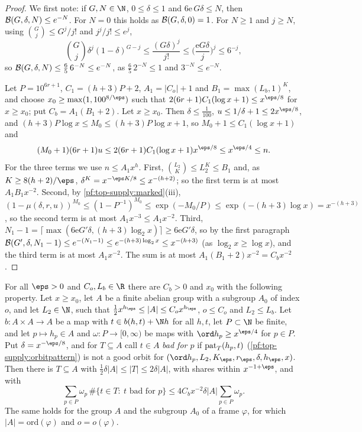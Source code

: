 \begin{proof}
We first note: if $G,N\in\N$, $0\le\delta\le1$ and $6\mathrm e\,G\delta\le N$, then $\mathcal{B}(G,\delta,N)\le e^{-N}$.
For $N=0$ this holds as $\mathcal{B}(G,\delta,0)=1$. For $N\ge1$ and $j\ge N$, using $\binom Gj\le G^j/j!$ and
$j^j/j!\le e^j$,
\[
\binom Gj\delta^j(1-\delta)^{G-j}\le\frac{(G\delta)^j}{j!}\le\Big(\frac{\mathrm eG\delta}j\Big)^j\le6^{-j},
\]
so $\mathcal{B}(G,\delta,N)\le\frac65\,6^{-N}\le e^{-N}$, as $\frac65\,2^{-N}\le1$ and $3^{-N}\le e^{-N}$.

Let $P=10^{6r+1}$, $C_1=(h+3)P+2$, $A_1=|C_o|+1$ and $B_1=\max(L_b,1)^K$, and choose $x_0\ge\max(1,100^{8/\eps})$ such that
$2(6r+1)C_1(\log x+1)\le x^{\eps/8}$ for $x\ge x_0$; put $C_b=A_1(B_1+2)$. Let $x\ge x_0$. Then $\delta\le\frac1{100}$,
$u\le1/\delta+1\le2x^{\eps/8}$, and $(h+3)P\log x\le M_0\le(h+3)P\log x+1$, so $M_0+1\le C_1(\log x+1)$ and
\[
(M_0+1)(6r+1)u\le2(6r+1)C_1(\log x+1)x^{\eps/8}\le x^{\eps/4}\le n.
\]
For the three terms we use $n\le A_1x^h$. First, $\binom{L_2}K\le L_2^K\le B_1$ and, as $K\ge8(h+2)/\eps$,
$\delta^K=x^{-\eps K/8}\le x^{-(h+2)}$; so the first term is at most $A_1B_1x^{-2}$. Second, by
\cref{pf:top-supply:marked}(iii), $(1-\mu(\delta,r,u))^{M_0}\le(1-P^{-1})^{M_0}\le\exp(-M_0/P)\le\exp(-(h+3)\log x)=x^{-(h+3)}$,
so the second term is at most $A_1x^{-3}\le A_1x^{-2}$. Third, $N_1-1=\lceil\max(6\mathrm eG'\delta,(h+3)\log_2x)\rceil\ge
6\mathrm eG'\delta$, so by the first paragraph $\mathcal{B}(G',\delta,N_1-1)\le e^{-(N_1-1)}\le e^{-(h+3)\log_2x}\le x^{-(h+3)}$
(as $\log_2x\ge\log x$), and the third term is at most $A_1x^{-2}$. The sum is at most $A_1(B_1+2)x^{-2}=C_bx^{-2}$.
\end{proof}

\begin{proposition}\label{pf:top-supply:topsgroup}
For all $\eps>0$ and $C_o,L_b\in\R$ there are $C_b>0$ and $x_0$ with the following property. Let $x\ge x_0$, let $A$ be a
finite abelian group with a subgroup $A_0$ of index $o$, and let $L_2\in\N$, such that
$\frac12x^{h_\eps}\le|A|\le C_ox^{h_\eps}$, $o\le C_o$ and $L_2\le L_b$. Let $b:A\times A\to A$ be a map with
$t\in b(h,t)+\N h$ for all $h,t$, let $P\subset\N$ be finite, and let $p\mapsto h_p\in A$ and $\omega:P\to[0,\infty)$ be maps
with $\ord h_p\ge x^{\eps/4}$ for $p\in P$. Put $\delta=x^{-\eps/8}$, and for $T\subseteq A$ call $t\in A$ \emph{bad for
$p$} if $\operatorname{pat}_T(h_p,t)$ (\cref{pf:top-supply:orbitpattern}) is not a good orbit for
$(\ord h_p,L_2,K_\eps,r_\eps,\delta,h_\eps,x)$. Then there is $T\subseteq A$ with $\frac12\delta|A|\le|T|\le2\delta|A|$, with
shares within $x^{-1+\eps}$, and with
\[
\sum_{p\in P}\omega_p\,\#\{t\in T:\ t\text{ bad for }p\}\le4C_bx^{-2}\delta|A|\sum_{p\in P}\omega_p.
\]
The same holds for the group $A$ and the subgroup $A_0$ of a frame $\varphi$, for which $|A|=\mathrm{ord}(\varphi)$ and
$o=o(\varphi)$.
 
 
\end{proposition}

